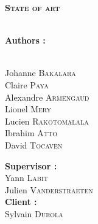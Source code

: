 
\begin{titlepage}
\begin{center}

{\Huge\textbf{{\textsc{ State of art }}\\[.2cm]}}
\textit{\\[0.5cm]}
\end{center}



\begin{minipage}[t]{0.4\textwidth}
\begin{flushleft} \large
\textbf{\large Authors :}\\%
\noindent\vspace{0mm}\\
\noindent\hspace{4mm}\begin{minipage}{.96\textwidth}
Johanne \textsc{Bakalara}\\
Claire \textsc{Paya}\\
Alexandre \textsc{Armengaud}\\
Lionel \textsc{Mery}\\
Lucien \textsc{Rakotomalala}\\
Ibrahim \textsc{Atto}\\
David \textsc{Tocaven}\\
\end{minipage}
\end{flushleft}
\end{minipage}\hfill%
\begin{minipage}[t]{0.38\textwidth}
\noindent\textbf{\large Supervisor :}\\
Yann \textsc{Labit}\\
Julien \textsc{Vanderstraeten}\\

 \vspace{1cm}
\textbf{\large Client :}\\
Sylvain \textsc{Durola}
\end{minipage}
\newline
\newline



\end{titlepage}
